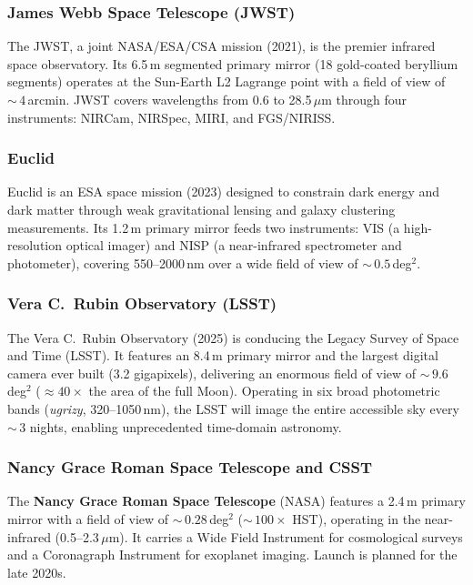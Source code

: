 \subsubsection{James Webb Space Telescope (JWST)}

The JWST, a joint NASA/ESA/CSA mission (2021), is the premier infrared space observatory. Its 6.5\,m segmented primary mirror (18 gold-coated beryllium segments) operates at the Sun-Earth L2 Lagrange point with a field of view of ${\sim}\,4$\,arcmin. JWST covers wavelengths from 0.6 to 28.5\,$\mu$m through four instruments: NIRCam, NIRSpec, MIRI, and FGS/NIRISS.

\subsubsection{Euclid}

Euclid is an ESA space mission (2023) designed to constrain dark energy and dark matter through weak gravitational lensing and galaxy clustering measurements. Its 1.2\,m primary mirror feeds two instruments: VIS (a high-resolution optical imager) and NISP (a near-infrared spectrometer and photometer), covering 550--2000\,nm over a wide field of view of ${\sim}\,0.5$\,deg$^2$.

\subsubsection{Vera C.\ Rubin Observatory (LSST)}

The Vera C.\ Rubin Observatory (2025) is conducing the Legacy Survey of Space and Time (LSST). It features an 8.4\,m primary mirror and the largest digital camera ever built (3.2 gigapixels), delivering an enormous field of view of ${\sim}\,9.6$\,deg$^2$ ($\approx 40 \times$ the area of the full Moon). Operating in six broad photometric bands (\textit{ugrizy}, 320--1050\,nm), the LSST will image the entire accessible sky every ${\sim}\,3$ nights, enabling unprecedented time-domain astronomy.

\subsubsection{Nancy Grace Roman Space Telescope and CSST}

The \textbf{Nancy Grace Roman Space Telescope} (NASA) features a 2.4\,m primary mirror with a field of view of ${\sim}\,0.28$\,deg$^2$ (${\sim}\,100 \times$ HST), operating in the near-infrared (0.5--2.3\,$\mu$m). It carries a Wide Field Instrument for cosmological surveys and a Coronagraph Instrument for exoplanet imaging. Launch is planned for the late 2020s.

